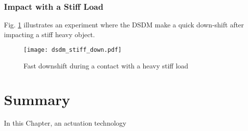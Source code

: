 \subsubsection{Impact with a Stiff Load}

Fig. \ref{fig:dsdm_stiff_down} illustrates an experiment where the DSDM make a quick down-shift after impacting a stiff heavy object. 

\begin{figure}[htp]
	\centering
		\texttt{[image: dsdm\_stiff\_down.pdf]}
	\caption{ Fast downshift during a contact with a heavy stiff load }
	\label{fig:dsdm_stiff_down}
\end{figure}

%
%
%






\newpage

\section{Summary}

In this Chapter, an actuation technology
